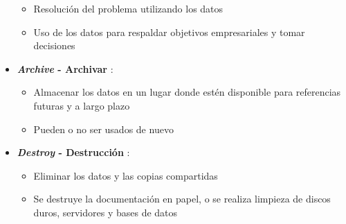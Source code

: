 \begin{itemize}
{    \begin{itemize}
        \item {Resolución del problema utilizando los datos}
        \item {Uso de los datos para respaldar objetivos empresariales y tomar decisiones}
    \end{itemize}}
    \item {\textbf{\textit{Archive} - Archivar} :
    \begin{itemize}
        \item {Almacenar los datos en un lugar donde estén disponible para referencias futuras y a largo plazo}
        \item {Pueden o no ser usados de nuevo}
    \end{itemize}}
    \item {\textbf{\textit{Destroy} - Destrucción} :
    \begin{itemize}
       \item {Eliminar los datos y las copias compartidas}
       \item {Se destruye la documentación en papel, o se realiza limpieza de discos duros, servidores y bases de datos}
    \end{itemize}}
\end{itemize}

